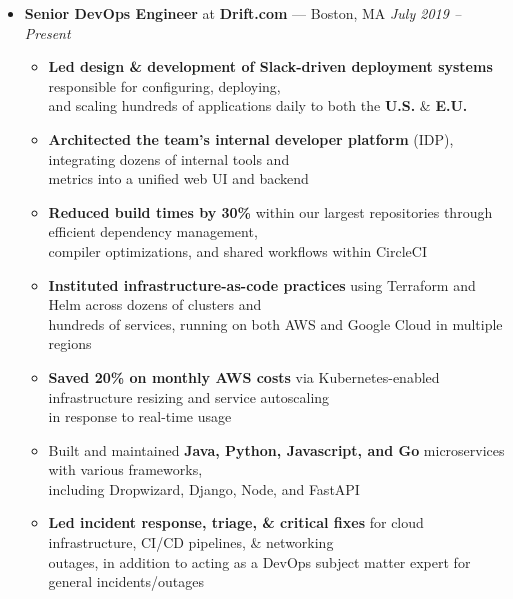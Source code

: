 \documentclass{article}
\begin{document}
\begin{itemize}[label={},leftmargin=*]
  \item \textbf{Senior DevOps Engineer} at \textbf{Drift.com} --- Boston, MA \hfill {\em July 2019 -- Present}
  \begin{itemize}[label={$\bullet$}]
    \item \textbf{Led design \& development of Slack-driven deployment systems} responsible for configuring, deploying,\\
          and scaling hundreds of applications daily to both the \textbf{U.S.} \& \textbf{E.U.}
    \item \textbf{Architected the team's internal developer platform} (IDP), integrating dozens of internal tools and\\
          metrics into a unified web UI and backend
    \item \textbf{Reduced build times by 30\%} within our largest repositories through efficient dependency management,\\
          compiler optimizations, and shared workflows within CircleCI
    \item \textbf{Instituted infrastructure-as-code practices} using Terraform and Helm across dozens of clusters and\\
          hundreds of services, running on both AWS and Google Cloud in multiple regions
    \item \textbf{Saved 20\% on monthly AWS costs} via Kubernetes-enabled infrastructure resizing and service autoscaling\\
          in response to real-time usage
    \item Built and maintained \textbf{Java, Python, Javascript, and Go} microservices with various frameworks,\\ 
          including Dropwizard, Django, Node, and FastAPI
    \item \textbf{Led incident response, triage, \& critical fixes} for cloud infrastructure, CI/CD pipelines, \& networking\\
          outages, in addition to acting as a DevOps subject matter expert for general incidents/outages

  \end{itemize}


\end{itemize}
\end{document}
